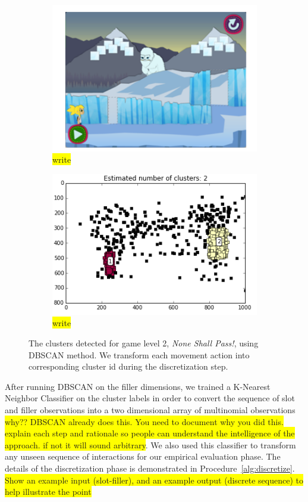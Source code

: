 \documentclass{sigchi}
\newcommand{\hl}[1]{\colorbox{yellow}{#1}}
\begin{document}
\begin{figure}[t]
 \centering
\begin{subfigure}{.5\textwidth}
	\centering
	\includegraphics[width=0.9\columnwidth]{figures/glacier_screenshot.png}
	\caption{\hl{write} \label{fig:screenshot}}
\end{subfigure}
\begin{subfigure}{.5\textwidth}
	\centering
	\includegraphics[width=0.9\columnwidth]{figures/glacier_positions.png}
	\caption{\hl{write} \label{fig:clustering}}
\end{subfigure}
\caption{The clusters detected for game level 2, \textit {None Shall Pass!}, using DBSCAN method. We transform each movement action into corresponding cluster id during the discretization step.\label{fig:figurecluster}}
\end{figure}

After running DBSCAN on the filler dimensions, we trained a K-Nearest Neighbor Classifier on the cluster labels in order to convert the sequence of slot and filler observations into a two dimensional array of multinomial observations \hl{why?? DBSCAN already does this.  You need to document why you did this. explain each step and rationale so people can understand the intelligence of the approach. if not it will sound arbitrary}.
We also used this classifier to transform any unseen sequence of interactions for our empirical evaluation phase. The details of the discretization phase is demonstrated in Procedure~\ref{alg:discretize}.
\hl{Show an example input (slot-filler), and an example output (discrete sequence) to help illustrate the point}
\end{document}
